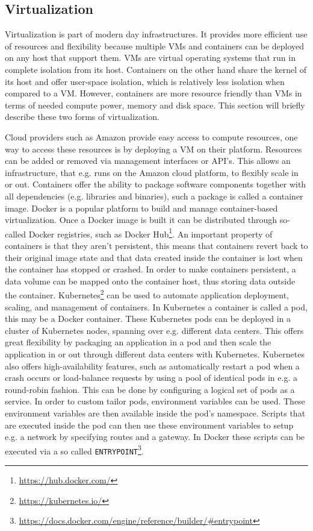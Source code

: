 \subsection{Virtualization}
\label{overview-virtualization}
Virtualization is part of modern day infrastructures. It provides more efficient use of resources and flexibility because multiple VMs and containers can be deployed on any host that support them. VMs are virtual operating systems that run in complete isolation from its host. Containers on the other hand share the kernel of its host and offer user-space isolation, which is relatively less isolation when compared to a VM. However, containers are more resource friendly than VMs in terms of needed compute power, memory and disk space. This section will briefly describe these two forms of virtualization.

Cloud providers such as Amazon provide easy access to compute resources, one way to access these resources is by deploying a VM on their platform. Resources can be added or removed via management interfaces or API's. This allows an infrastructure, that e.g. runs on the Amazon cloud platform, to flexibly scale in or out. Containers offer the ability to package software components together with all dependencies (e.g. libraries and binaries), such a package is called a container image. Docker is a popular platform to build and manage container-based virtualization. Once a Docker image is built it can be distributed through so-called Docker registries, such as Docker Hub\footnote{\url{https://hub.docker.com/}}. An important property of containers is that they aren't persistent, this means that containers revert back to their original image state and that data created inside the container is lost when the container has stopped or crashed. In order to make containers persistent, a data volume can be mapped onto the container host, thus storing data outside the container. Kubernetes\footnote{\url{https://kubernetes.io/}} can be used to automate application deployment, scaling, and management of containers. In Kubernetes a container is called a pod, this may be a Docker container. These Kubernetes pods can be deployed in a cluster of Kubernetes nodes, spanning over e.g. different data centers. This offers great flexibility by packaging an application in a pod and then scale the application in or out through different data centers with Kubernetes. Kubernetes also offers high-availability features, such as automatically restart a pod when a crash occurs or load-balance requests by using a pool of identical pods in e.g. a round-robin fashion. This can be done by configuring a logical set of pods as a service. In order to custom tailor pods, environment variables can be used. These environment variables are then available inside the pod's namespace. Scripts that are executed inside the pod can then use these environment variables to setup e.g. a network by specifying routes and a gateway. In Docker these scripts can be executed via a so called \texttt{ENTRYPOINT}\footnote{\url{https://docs.docker.com/engine/reference/builder/\#entrypoint}}.